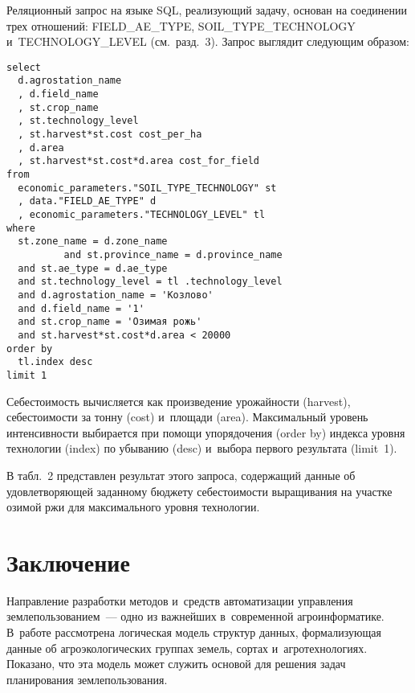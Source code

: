  \begin{multicols}{2}  


    
Реляционный запрос на языке SQL, ре\-а\-ли\-зу\-ющий задачу, основан на 
соединении  трех отношений: FIELD\_AE\_TYPE,
SOIL\_TYPE\_\linebreak TECHNOLOGY и~TECHNOLOGY\_LEVEL (см.\ разд.~3). Запрос 
выглядит сле\-ду\-ющим образом:

\vspace*{-6pt}

\noindent
   {\small \begin{verbatim}
select
  d.agrostation_name
  , d.field_name
  , st.crop_name
  , st.technology_level
  , st.harvest*st.cost cost_per_ha
  , d.area
  , st.harvest*st.cost*d.area cost_for_field
from
  economic_parameters."SOIL_TYPE_TECHNOLOGY" st
  , data."FIELD_AE_TYPE" d
  , economic_parameters."TECHNOLOGY_LEVEL" tl
where
  st.zone_name = d.zone_name 
          and st.province_name = d.province_name
  and st.ae_type = d.ae_type
  and st.technology_level = tl .technology_level
  and d.agrostation_name = 'Козлово'
  and d.field_name = '1'
  and st.crop_name = 'Озимая рожь'
  and st.harvest*st.cost*d.area < 20000
order by
  tl.index desc
limit 1
    \end{verbatim}
    }
    
    \vspace*{-6pt}
    
    Себестоимость вычисляется как произведение урожайности (harvest), 
се\-бе\-сто\-и\-мости за тонну (cost) и~площади (area). Максимальный уровень 
ин\-тен\-сив\-ности выбирается при помощи упорядочения (order by) индекса 
уровня технологии (index) по убыванию (desc) и~выбора первого результата 
(limit~1).


    
    
    В табл.~2 представлен результат этого запроса, содержащий данные об 
удовле\-тво\-ря\-ющей заданному бюджету се\-бе\-сто\-и\-мости выращивания на 
участ\-ке озимой ржи для максимального уров\-ня технологии.
    
    

\section{Заключение}

    Направление разработки методов и~средств автоматизации управ\-ле\-ния 
землепользованием~--- одно из важ\-ней\-ших в~современной агроинформатике. 
В~работе рас\-смот\-ре\-на логическая модель структур данных, 
фор\-ма\-ли\-зу\-ющая данные об агроэкологических группах земель, сортах 
и~агротехнологиях. Показано, что эта модель может служить основой для 
решения задач планирования землепользования.
    

\end{multicols}
